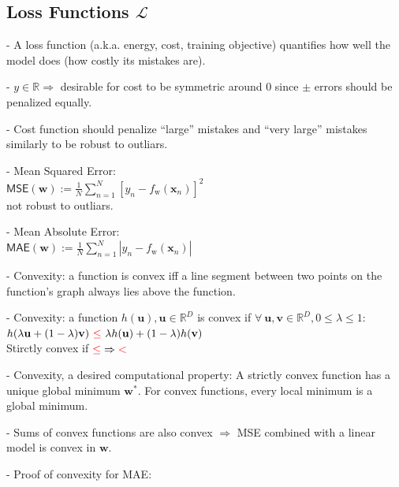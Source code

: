 \documentclass[10pt]{article}
\begin{document}
\begin{multicols*}{4}
\subsection{Loss Functions $\mathcal{L}$}

- A loss function (a.k.a. energy, cost, training objective) quantifies how well the model does (how costly its mistakes are).

- $y \in \mathbb{R} \Rightarrow$ desirable for cost to be symmetric around 0 since $\pm$ errors should be penalized equally.

- Cost function should penalize “large” mistakes and “very large” mistakes similarly to be robust to outliars.

- Mean Squared Error: \\ ${\mathsf{MSE}}(\mathbf{w}):={\frac{1}{N}}\sum_{n=1}^{N}\left[y_{n}-f_{\mathrm{w}}(\mathbf{x}_{n})\right]^{2}$ \\ not robust to outliars.

- Mean Absolute Error: \\ ${\mathsf{MAE}}(\mathbf{w}):={\frac{1}{N}}\sum_{n=1}^{N}|y_{n}-f_{\mathrm{w}}(\mathbf{x}_{n})|$

- Convexity: a function is convex iff a line segment between two points on the function’s graph always lies above the function.

- Convexity: a function $h(\mathbf{u}), \mathbf{u} \in \mathbb{R}^D$ is convex if $\forall \ \mathbf{u}, \mathbf{v} \in \mathbb{R}^D, 0 \leq \lambda \leq  1$: \\ $h(\lambda\mathbf{u}+(1-\lambda)\mathbf{v}) \ \textcolor[RGB]{255,0,0}{\leq} \ \lambda h(\mathbf{u})+(1-\lambda)h(\mathbf{v})$ \\Stirctly convex if $\textcolor[RGB]{255,0,0}{\leq} \Rightarrow \textcolor[RGB]{255,0,0}{<}$ 

- Convexity, a desired computational property:
A strictly convex function has a unique global minimum $\mathbf{w^{*}}$. For convex functions, every local minimum is a global minimum.

- Sums of convex functions are also convex $\Rightarrow$ MSE combined with a linear model is convex in $\mathbf{w}$.

- Proof of convexity for MAE:


\end{multicols*}
\end{document}
